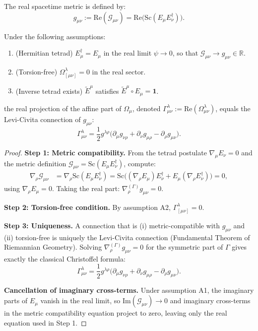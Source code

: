 The real spacetime metric is defined by:
\begin{equation}
g_{\mu\nu} := \mathrm{Re}(\mathcal{G}_{\mu\nu}) = \mathrm{Re}\bigl(\mathrm{Sc}(E_\mu E_\nu^\dagger)\bigr).
\end{equation}

\begin{lemma}
\label{lem:re_omega_levi_civita}
Under the following assumptions:
\begin{enumerate}
  \item[(A1)] (Hermitian tetrad) $E_\mu^\dagger = E_\mu$ in the real limit $\psi \to 0$, so that $\mathcal{G}_{\mu\nu} \to g_{\mu\nu} \in \mathbb{R}$.
  \item[(A2)] (Torsion-free) $\Omega_{[\mu\nu]}^\lambda = 0$ in the real sector.
  \item[(A3)] (Inverse tetrad exists) $\tilde{E}^\mu$ satisfies $\tilde{E}^\mu \circ E_\mu = \mathbf{1}$.
\end{enumerate}
the real projection of the affine part of $\Omega_\mu$, denoted
$\Gamma^\lambda_{\mu\nu} := \mathrm{Re}(\Omega^\lambda_{\mu\nu})$,
equals the Levi-Civita connection of $g_{\mu\nu}$:
\begin{equation}
\Gamma^\lambda_{\mu\nu} = \frac{1}{2} g^{\lambda\rho}\bigl(\partial_\mu g_{\nu\rho} + \partial_\nu g_{\mu\rho} - \partial_\rho g_{\mu\nu}\bigr).
\end{equation}
\end{lemma}

\begin{proof}
\textbf{Step 1: Metric compatibility.}
From the tetrad postulate $\nabla_\mu E_\nu = 0$ and the metric definition
$\mathcal{G}_{\mu\nu} = \mathrm{Sc}(E_\mu E_\nu^\dagger)$, compute:
\begin{align}
\nabla_\rho \mathcal{G}_{\mu\nu}
  &= \nabla_\rho \mathrm{Sc}(E_\mu E_\nu^\dagger)
   = \mathrm{Sc}\bigl((\nabla_\rho E_\mu) E_\nu^\dagger + E_\mu (\nabla_\rho E_\nu^\dagger)\bigr) = 0,
\end{align}
using $\nabla_\rho E_\mu = 0$.  Taking the real part: $\nabla^{(\Gamma)}_\rho g_{\mu\nu} = 0$.

\textbf{Step 2: Torsion-free condition.}
By assumption A2, $\Gamma^\lambda_{[\mu\nu]} = 0$.

\textbf{Step 3: Uniqueness.}
A connection that is (i) metric-compatible with $g_{\mu\nu}$ and (ii) torsion-free is
uniquely the Levi-Civita connection (Fundamental Theorem of Riemannian Geometry).
Solving $\nabla^{(\Gamma)}_\rho g_{\mu\nu} = 0$ for the symmetric part of $\Gamma$
gives exactly the classical Christoffel formula:
\begin{equation}
\Gamma^\lambda_{\mu\nu} = \frac{1}{2} g^{\lambda\rho}\bigl(\partial_\mu g_{\nu\rho} + \partial_\nu g_{\mu\rho} - \partial_\rho g_{\mu\nu}\bigr).
\end{equation}

\textbf{Cancellation of imaginary cross-terms.}
Under assumption A1, the imaginary parts of $E_\mu$ vanish in the real limit, so
$\mathrm{Im}(\mathcal{G}_{\mu\nu}) \to 0$ and imaginary cross-terms in the metric
compatibility equation project to zero, leaving only the real equation used in Step 1.
\end{proof}

